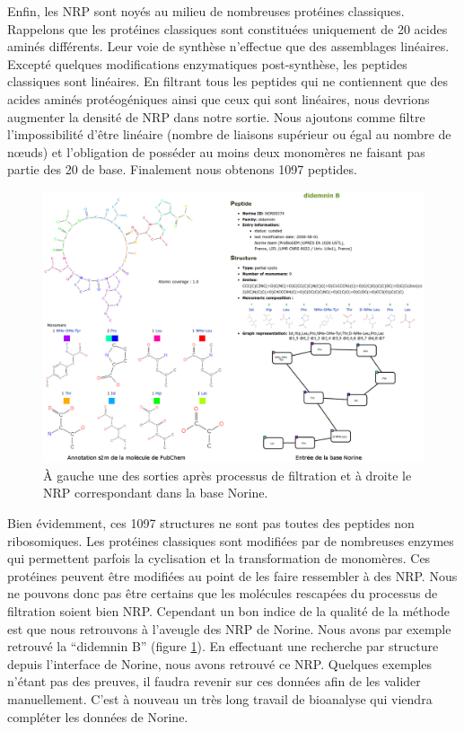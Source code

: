 Enfin, les NRP sont noyés au milieu de nombreuses protéines classiques.
Rappelons que les protéines classiques sont constituées uniquement de 20 acides aminés différents.
Leur voie de synthèse n'effectue que des assemblages linéaires.
Excepté quelques modifications enzymatiques post-synthèse, les peptides classiques sont linéaires.
En filtrant tous les peptides qui ne contiennent que des acides aminés protéogéniques ainsi que ceux qui sont linéaires, nous devrions augmenter la densité de NRP dans notre sortie.
Nous ajoutons comme filtre l'impossibilité d'être linéaire (nombre de liaisons supérieur ou égal au nombre de nœuds) et l'obligation de posséder au moins deux monomères ne faisant pas partie des 20 de base.
Finalement nous obtenons 1097 peptides.

\begin{figure}[h!]
  \begin{center}
    \includegraphics[width=450px]{Figures/contributions/didemnin_B.png}
    \caption{\label{didemin}À gauche une des sorties après processus de filtration et à droite le NRP correspondant dans la base Norine.}
  \end{center}
\end{figure}

Bien évidemment, ces 1097 structures ne sont pas toutes des peptides non ribosomiques.
Les protéines classiques sont modifiées par de nombreuses enzymes qui permettent parfois la cyclisation et la transformation de monomères.
Ces protéines peuvent être modifiées au point de les faire ressembler à des NRP.
Nous ne pouvons donc pas être certains que les molécules rescapées du processus de filtration soient bien NRP.
Cependant un bon indice de la qualité de la méthode est que nous retrouvons à l'aveugle des NRP de Norine.
Nous avons par exemple retrouvé la ``didemnin B'' (figure \ref{didemin}).
En effectuant une recherche par structure depuis l'interface de Norine, nous avons retrouvé ce NRP.
Quelques exemples n'étant pas des preuves, il faudra revenir sur ces données afin de les valider manuellement.
C'est à nouveau un très long travail de bioanalyse qui viendra compléter les données de Norine.



